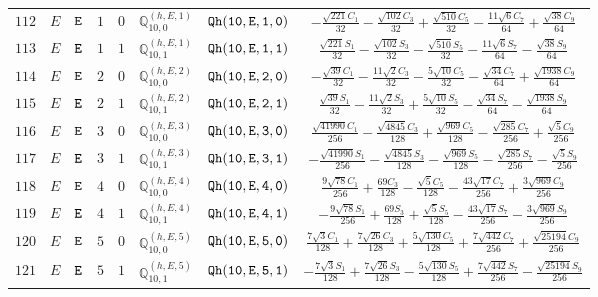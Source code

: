 \documentclass[fleqn,8pt]{jsarticle}
\begin{document}
\begin{table}[ht!]
\begin{center}
\begin{tabular}{cccccccc}
$ 112 $ & $ E $ & $ {\tt E} $ & $ 1 $ & $ 0 $ & $ \mathbb{Q}_{10,0}^{(h,E,1)} $ & $ {\tt Qh(10,E,1,0)} $ & $ - \frac{\sqrt{221} C_{1}}{32} - \frac{\sqrt{102} C_{3}}{32} + \frac{\sqrt{510} C_{5}}{32} - \frac{11 \sqrt{6} C_{7}}{64} + \frac{\sqrt{38} C_{9}}{64} $ \\
$ 113 $ & $ E $ & $ {\tt E} $ & $ 1 $ & $ 1 $ & $ \mathbb{Q}_{10,1}^{(h,E,1)} $ & $ {\tt Qh(10,E,1,1)} $ & $ \frac{\sqrt{221} S_{1}}{32} - \frac{\sqrt{102} S_{3}}{32} - \frac{\sqrt{510} S_{5}}{32} - \frac{11 \sqrt{6} S_{7}}{64} - \frac{\sqrt{38} S_{9}}{64} $ \\
$ 114 $ & $ E $ & $ {\tt E} $ & $ 2 $ & $ 0 $ & $ \mathbb{Q}_{10,0}^{(h,E,2)} $ & $ {\tt Qh(10,E,2,0)} $ & $ - \frac{\sqrt{39} C_{1}}{32} - \frac{11 \sqrt{2} C_{3}}{32} - \frac{5 \sqrt{10} C_{5}}{32} - \frac{\sqrt{34} C_{7}}{64} + \frac{\sqrt{1938} C_{9}}{64} $ \\
$ 115 $ & $ E $ & $ {\tt E} $ & $ 2 $ & $ 1 $ & $ \mathbb{Q}_{10,1}^{(h,E,2)} $ & $ {\tt Qh(10,E,2,1)} $ & $ \frac{\sqrt{39} S_{1}}{32} - \frac{11 \sqrt{2} S_{3}}{32} + \frac{5 \sqrt{10} S_{5}}{32} - \frac{\sqrt{34} S_{7}}{64} - \frac{\sqrt{1938} S_{9}}{64} $ \\
$ 116 $ & $ E $ & $ {\tt E} $ & $ 3 $ & $ 0 $ & $ \mathbb{Q}_{10,0}^{(h,E,3)} $ & $ {\tt Qh(10,E,3,0)} $ & $ \frac{\sqrt{41990} C_{1}}{256} - \frac{\sqrt{4845} C_{3}}{128} + \frac{\sqrt{969} C_{5}}{128} - \frac{\sqrt{285} C_{7}}{256} + \frac{\sqrt{5} C_{9}}{256} $ \\
$ 117 $ & $ E $ & $ {\tt E} $ & $ 3 $ & $ 1 $ & $ \mathbb{Q}_{10,1}^{(h,E,3)} $ & $ {\tt Qh(10,E,3,1)} $ & $ - \frac{\sqrt{41990} S_{1}}{256} - \frac{\sqrt{4845} S_{3}}{128} - \frac{\sqrt{969} S_{5}}{128} - \frac{\sqrt{285} S_{7}}{256} - \frac{\sqrt{5} S_{9}}{256} $ \\
$ 118 $ & $ E $ & $ {\tt E} $ & $ 4 $ & $ 0 $ & $ \mathbb{Q}_{10,0}^{(h,E,4)} $ & $ {\tt Qh(10,E,4,0)} $ & $ \frac{9 \sqrt{78} C_{1}}{256} + \frac{69 C_{3}}{128} - \frac{\sqrt{5} C_{5}}{128} - \frac{43 \sqrt{17} C_{7}}{256} + \frac{3 \sqrt{969} C_{9}}{256} $ \\
$ 119 $ & $ E $ & $ {\tt E} $ & $ 4 $ & $ 1 $ & $ \mathbb{Q}_{10,1}^{(h,E,4)} $ & $ {\tt Qh(10,E,4,1)} $ & $ - \frac{9 \sqrt{78} S_{1}}{256} + \frac{69 S_{3}}{128} + \frac{\sqrt{5} S_{5}}{128} - \frac{43 \sqrt{17} S_{7}}{256} - \frac{3 \sqrt{969} S_{9}}{256} $ \\
$ 120 $ & $ E $ & $ {\tt E} $ & $ 5 $ & $ 0 $ & $ \mathbb{Q}_{10,0}^{(h,E,5)} $ & $ {\tt Qh(10,E,5,0)} $ & $ \frac{7 \sqrt{3} C_{1}}{128} + \frac{7 \sqrt{26} C_{3}}{128} + \frac{5 \sqrt{130} C_{5}}{128} + \frac{7 \sqrt{442} C_{7}}{256} + \frac{\sqrt{25194} C_{9}}{256} $ \\
$ 121 $ & $ E $ & $ {\tt E} $ & $ 5 $ & $ 1 $ & $ \mathbb{Q}_{10,1}^{(h,E,5)} $ & $ {\tt Qh(10,E,5,1)} $ & $ - \frac{7 \sqrt{3} S_{1}}{128} + \frac{7 \sqrt{26} S_{3}}{128} - \frac{5 \sqrt{130} S_{5}}{128} + \frac{7 \sqrt{442} S_{7}}{256} - \frac{\sqrt{25194} S_{9}}{256} $ \\
 \hline \hline
\end{tabular}
\end{center}
\end{table}
\end{document}
